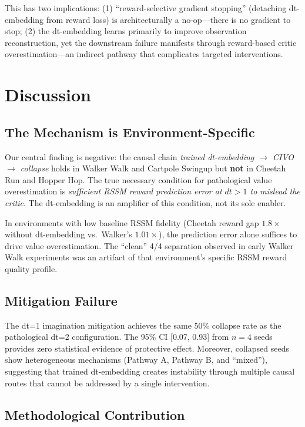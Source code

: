 \documentclass[10pt,twocolumn]{article}
\begin{document}
This has two implications: (1) ``reward-selective gradient stopping'' (detaching dt-embedding from reward loss) is architecturally a no-op---there is no gradient to stop; (2) the dt-embedding learns primarily to improve observation reconstruction, yet the downstream failure manifests through reward-based critic overestimation---an indirect pathway that complicates targeted interventions.

\section{Discussion}

\subsection{The Mechanism is Environment-Specific}

Our central finding is negative: the causal chain \emph{trained dt-embedding $\rightarrow$ CIVO $\rightarrow$ collapse} holds in Walker Walk and Cartpole Swingup but \textbf{not} in Cheetah Run and Hopper Hop. The true necessary condition for pathological value overestimation is \emph{sufficient RSSM reward prediction error at $dt>1$ to mislead the critic}. The dt-embedding is an amplifier of this condition, not its sole enabler.

In environments with low baseline RSSM fidelity (Cheetah reward gap $1.8\times$ without dt-embedding vs.\ Walker's $1.01\times$), the prediction error alone suffices to drive value overestimation. The ``clean'' 4/4 separation observed in early Walker Walk experiments was an artifact of that environment's specific RSSM reward quality profile.

\subsection{Mitigation Failure}

The dt=1 imagination mitigation achieves the same 50\% collapse rate as the pathological dt=2 configuration. The 95\% CI [0.07, 0.93] from $n=4$ seeds provides zero statistical evidence of protective effect. Moreover, collapsed seeds show heterogeneous mechanisms (Pathway A, Pathway B, and ``mixed''), suggesting that trained dt-embedding creates instability through multiple causal routes that cannot be addressed by a single intervention.

\subsection{Methodological Contribution}
\end{document}
